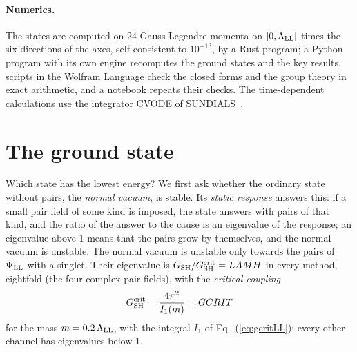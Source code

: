 \documentclass[aps,prd,twocolumn,superscriptaddress,nofootinbib,floatfix,longbibliography]{revtex4-2}
\newcommand{\LL}{{\rm LL}}
\newcommand{\SH}{{\rm SH}}
\begin{document}
\paragraph*{Numerics.} The states are computed on 24 Gauss-Legendre momenta on $[0,\Lambda_\LL]$ times the six
directions of the axes, self-consistent to $10^{-13}$, by a Rust program; a Python program with its own engine recomputes
the ground states and the key results, scripts in the Wolfram Language check the closed forms and the group theory in
exact arithmetic, and a notebook repeats their checks. The time-dependent calculations use the integrator CVODE
of SUNDIALS~\cite{SUNDIALS2005,SUNDIALS2022}.

\section{The ground state}
\label{sec:ground}

Which state has the lowest energy? We first ask whether the ordinary state without pairs, the \emph{normal vacuum}, is
stable. Its \emph{static response} answers this: if a small pair field of some kind is imposed, the state answers with
pairs of that kind, and the ratio of the answer to the cause is an eigenvalue of the response; an eigenvalue above 1
means that the pairs grow by themselves, and the normal vacuum is unstable. The normal vacuum is unstable only towards
the pairs of $\Psi_\LL$ with a singlet. Their eigenvalue is $G_\SH/G^{\rm crit}_\SH={{LAMH}}$ in every method, eightfold
(the four complex pair fields), with the \emph{critical coupling}
\begin{equation}
G^{\rm crit}_\SH=\frac{4\pi^2}{I_1(m)}={{GCRIT}}
\label{eq:Gcrit}
\end{equation}
for the mass $m=0.2\,\Lambda_\LL$, with the integral $I_1$ of Eq.~(\ref{eq:gcritLL}); every other channel has
eigenvalues below 1.
\end{document}
